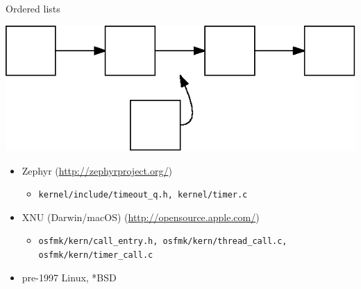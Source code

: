 \documentclass{beamer}
\begin{document}


\begin{frame}{Ordered lists}
  \begin{center}
    \includegraphics{ordered-list.eps}
  \end{center}

  \begin{itemize}
  \item Zephyr (\hyperlink{http://zephyrproject.org/}{http://zephyrproject.org/})
    \begin{itemize}
    \item \texttt{kernel/include/timeout\_q.h, kernel/timer.c}
    \end{itemize}
  \item XNU (Darwin/macOS) (\hyperlink{http://opensource.apple.com/}{http://opensource.apple.com/})
    \begin{itemize}
    \item \texttt{osfmk/kern/call\_entry.h, osfmk/kern/thread\_call.c, osfmk/kern/timer\_call.c}
    \end{itemize}
  \item pre-1997 Linux, *BSD
  \end{itemize}
\end{frame}


\end{document}
